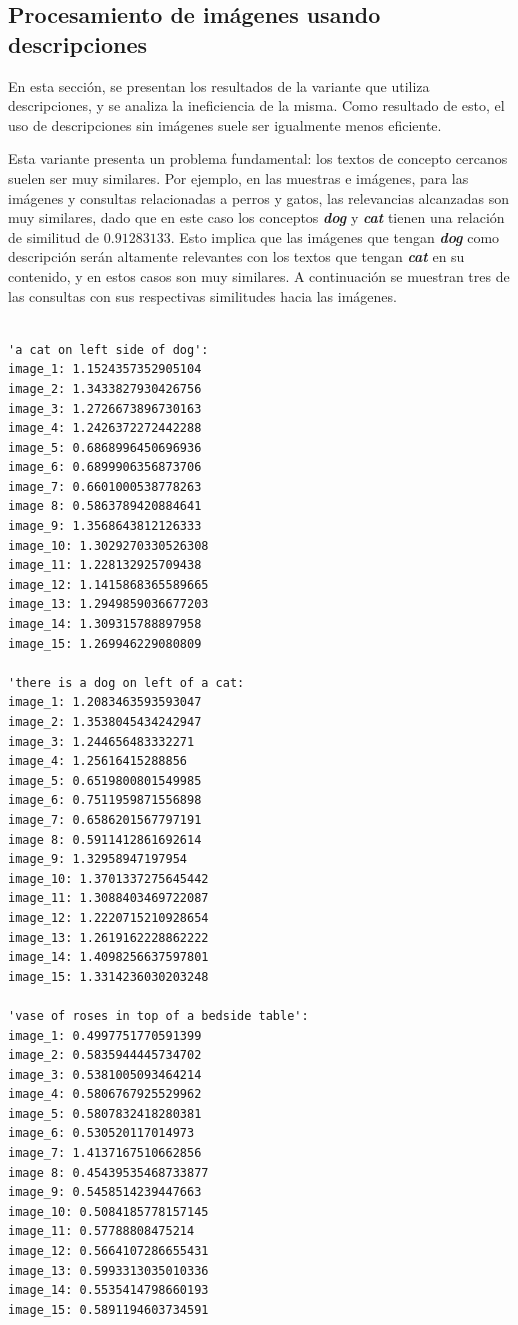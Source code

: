 \subsection{Procesamiento de im\'agenes usando descripciones}
En esta sección, se presentan los resultados de la variante que utiliza descripciones, y se analiza la ineficiencia de la misma. Como resultado de esto, el uso de descripciones sin im\'agenes suele ser igualmente menos eficiente.

Esta variante presenta un problema fundamental: los textos de concepto cercanos suelen ser muy similares. Por ejemplo, en las muestras e im\'agenes, para las im\'agenes y consultas relacionadas a perros y gatos, las relevancias alcanzadas son muy similares, dado que en este caso los conceptos \textbf\textit{{dog}} y \textbf{\textit{cat}} tienen una relación de similitud de $0.91283133$. Esto implica que las im\'agenes que tengan \textbf{\textit{dog}} como descripción ser\'an altamente relevantes con los textos que tengan \textbf{\textit{cat}} en su contenido, y en estos casos son muy similares. A continuaci\'on se muestran tres de las consultas con sus respectivas similitudes hacia las im\'agenes.

\begin{verbatim}

'a cat on left side of dog':
image_1: 1.1524357352905104
image_2: 1.3433827930426756
image_3: 1.2726673896730163
image_4: 1.2426372272442288
image_5: 0.6868996450696936
image_6: 0.6899906356873706
image_7: 0.6601000538778263
image 8: 0.5863789420884641
image_9: 1.3568643812126333
image_10: 1.3029270330526308
image_11: 1.228132925709438
image_12: 1.1415868365589665
image_13: 1.2949859036677203
image_14: 1.309315788897958
image_15: 1.269946229080809

'there is a dog on left of a cat:
image_1: 1.2083463593593047
image_2: 1.3538045434242947
image_3: 1.244656483332271
image_4: 1.25616415288856
image_5: 0.6519800801549985
image_6: 0.7511959871556898
image_7: 0.6586201567797191
image 8: 0.5911412861692614
image_9: 1.32958947197954
image_10: 1.3701337275645442
image_11: 1.3088403469722087
image_12: 1.2220715210928654
image_13: 1.2619162228862222
image_14: 1.4098256637597801
image_15: 1.3314236030203248

'vase of roses in top of a bedside table':
image_1: 0.4997751770591399
image_2: 0.5835944445734702
image_3: 0.5381005093464214
image_4: 0.5806767925529962
image_5: 0.5807832418280381
image_6: 0.530520117014973
image_7: 1.4137167510662856
image 8: 0.45439535468733877
image_9: 0.5458514239447663
image_10: 0.5084185778157145
image_11: 0.57788808475214
image_12: 0.5664107286655431
image_13: 0.5993313035010336
image_14: 0.5535414798660193
image_15: 0.5891194603734591

\end{verbatim}

